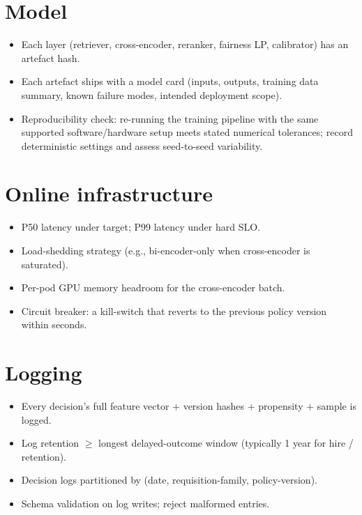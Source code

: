 \documentclass[11pt,oneside]{scrbook}
\begin{document}
\section{Model}

\begin{itemize}\setlength\itemsep{0pt}
  \item Each layer (retriever, cross-encoder, reranker, fairness LP,
        calibrator) has an artefact hash.
  \item Each artefact ships with a model card (inputs, outputs, training
        data summary, known failure modes, intended deployment scope).
  \item Reproducibility check: re-running the training pipeline with the
        same supported software/hardware setup meets stated numerical tolerances;
record deterministic settings and assess seed-to-seed variability.
\end{itemize}

\section{Online infrastructure}

\begin{itemize}\setlength\itemsep{0pt}
  \item P50 latency under target; P99 latency under hard SLO.
  \item Load-shedding strategy (e.g., bi-encoder-only when cross-encoder is
        saturated).
  \item Per-pod GPU memory headroom for the cross-encoder batch.
  \item Circuit breaker: a kill-switch that reverts to the previous policy
        version within seconds.
\end{itemize}

\section{Logging}

\begin{itemize}\setlength\itemsep{0pt}
  \item Every decision's full feature vector + version hashes + propensity
        + sample is logged.
  \item Log retention $\geq$ longest delayed-outcome window (typically 1
        year for hire / retention).
  \item Decision logs partitioned by (date, requisition-family, policy-version).
  \item Schema validation on log writes; reject malformed entries.
\end{itemize}
\end{document}
